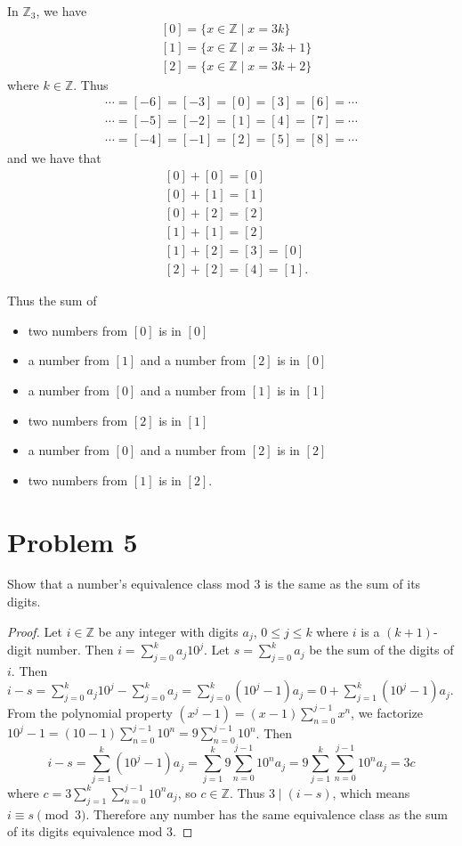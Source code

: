 \documentclass[12pt]{article}
\newcommand{\Z}{\mathbb{Z}}
\theoremstyle{definition}
\begin{document}
In \(\Z_3\), we have 
\begin{align*}
&[0] = \{x\in\Z\mid x=3k\}\\
&[1] = \{x\in\Z\mid x=3k + 1\}\\
&[2] = \{x\in\Z\mid x=3k + 2\}
\end{align*}
where \(k\in\Z\). Thus 
\begin{align*}
    \cdots = [-6] = [-3] = [0] = [3] = [6] = \cdots\\
    \cdots = [-5] = [-2] = [1] = [4] = [7] = \cdots\\
    \cdots = [-4] = [-1] = [2] = [5] = [8] = \cdots
\end{align*} and we have that 
\begin{align*}
    &[0]+[0] = [0]\\
    &[0]+[1]=[1]\\
    &[0]+[2] = [2]\\
    &[1]+[1] = [2]\\
    &[1] + [2]=[3]=[0]\\
    &[2]+[2] = [4] = [1].
\end{align*}

Thus the sum of \begin{itemize}
\item two numbers from \([0]\) is in \([0]\)
\item a number from \([1]\) and a number from \([2]\) is in \([0]\)
\item a number from \([0]\) and a number from \([1]\) is in \([1]\)
\item two numbers from \([2]\) is in \([1]\)
\item a number from \([0]\) and a number from \([2]\) is in \([2]\)
\item two numbers from \([1]\) is in \([2]\).
\end{itemize}
\section*{Problem 5}
Show that a number’s equivalence class mod \(3\) is the same as the sum of its digits.
\begin{proof}
    Let \(i\in\Z\) be any integer with digits \(a_j\), \(0\leq j\leq k\) where \(i\) is a \((k+1)\)-digit number. Then \(i = \sum_{j=0}^k a_j10^j\). Let \(s=\sum_{j=0}^k a_j\) be the sum of the digits of \(i\). Then \(i-s = \sum_{j=0}^k a_j10^j - \sum_{j=0}^k a_j = \sum_{j=0}^k (10^j - 1)a_j = 0 + \sum_{j=1}^k (10^j - 1)a_j\). From the polynomial property \((x^j-1) = (x-1)\sum_{n=0}^{j-1}x^n\), we factorize \(10^j - 1 = (10-1)\sum_{n=0}^{j-1}10^n = 9\sum_{n=0}^{j-1}10^n\). Then \[i-s = \sum_{j=1}^k (10^j - 1)a_j = \sum_{j=1}^k 9\sum_{n=0}^{j-1}10^n a_j = 9\sum_{j=1}^k\sum_{n=0}^{j-1}10^n a_j = 3c\]
    where \(c=3\sum_{j=1}^k\sum_{n=0}^{j-1}10^n a_j\), so \(c\in\Z\). Thus \(3\mid (i-s)\), which means \(i\equiv s\pmod{3}\). Therefore any number has the same equivalence class as the sum of its digits equivalence mod \(3\).
\end{proof}
\end{document}
